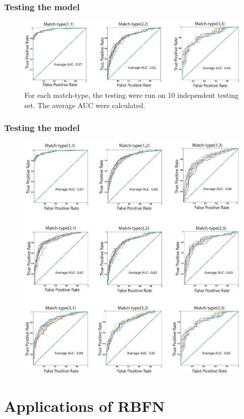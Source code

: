 \documentclass[hyperref={pdfpagelabels=false}]{beamer}
\begin{document}
\begin{frame}
\frametitle{Testing the model}
\begin{figure}[H]
	\centering
	\includegraphics[scale=0.45]{Discrimination2-03.eps}
	\caption{\small{For each match-type, the testing were run on 10 independent testing set. The average AUC were calculated.}}
\end{figure}
\end{frame}

\begin{frame}
\frametitle{Testing the model}
\begin{figure}[H]
	\centering
	\includegraphics[scale=0.35]{PositiveNegativeDiscrimination.eps}
\end{figure}
\end{frame}


\section{ Applications of RBFN }
\end{document}
